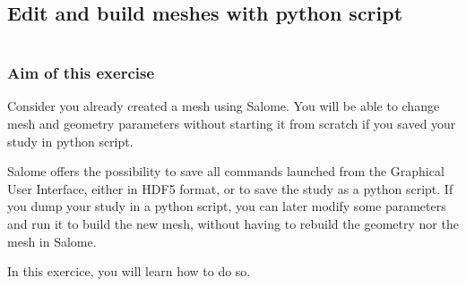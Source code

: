 \documentclass[10pt, hyperref={unicode=true,pdfusetitle, bookmarks=true,bookmarksnumbered=false,bookmarksopen=false, breaklinks=false,pdfborder={0 0l 1},backref=true,colorlinks=true,linkcolor=darkblue,pageanchor}]{beamer}
\begin{document}
\subsection{Edit and build meshes with python script}
\begin{frame}
\begin{small}
\begin{columns}[c] 
\tableofcontents[sections={1-8},currentsection, currentsubsection]
\tableofcontents[sections={9-16},currentsection, currentsubsection]
\end{columns}
\end{small}
\end{frame}
\begin{frame}
\frametitle{Aim of this exercise}

\begin{block}{}
Consider you already created a mesh using Salome. You will be able to change mesh and geometry parameters without starting it from scratch if you saved your study in python script.
\newline

Salome offers the possibility to save all commands launched from the Graphical User Interface, either in HDF5 format, or to save the study as a python script. 
If you dump your study in a python script, you can later modify some parameters and run it to build the new mesh, without having to rebuild the geometry nor the mesh in Salome.
\newline

In this exercice, you will learn how to do so.

\end{block}

\end{frame}
\end{document}

